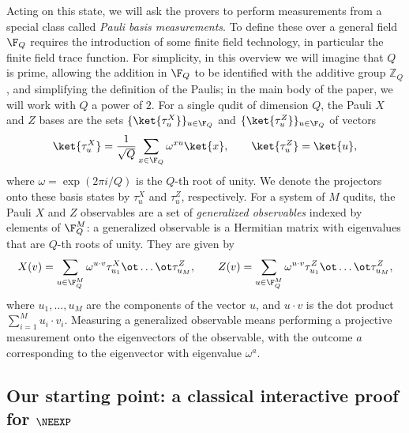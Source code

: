 Acting on this state, we will ask the provers to perform measurements
from a special class called \emph{Pauli basis measurements}. To define
these over a general field $\F_Q$ requires the introduction of some
finite field technology, in particular the finite field trace
function. For simplicity, in this overview we will imagine that $Q$ is
prime, allowing the addition in $\F_Q$ to be identified with the
additive group $\mathbb{Z}_Q$, and simplifying the definition of the
Paulis; in the main body of the paper, we will work with $Q$ a power
of $2$. For a single qudit of dimension $Q$, the Pauli $X$ and $Z$
bases are the sets $\{\ket{\tau^X_u}\}_{u \in \F_Q}$ and $\{\ket{\tau^Z_u}\}_{u
  \in \F_Q}$ of vectors
\[ \ket{\tau^X_u} = \frac{1}{\sqrt{Q}}\sum_{x \in \F_Q}  \omega^{x u} \ket{x}, \qquad
  \ket{\tau^Z_u} = \ket{u}, \]
where $\omega = \exp(2\pi i/Q)$ is the $Q$-th root of unity. We denote
the projectors onto these basis states by $\tau^X_u$ and $\tau^Z_u$,
respectively. For a system of $M$ qudits, the Pauli
$X$ and $Z$ observables are a set of \emph{generalized observables}
indexed by elements of $\F_Q^M$: a generalized observable is a
Hermitian matrix with eigenvalues that are $Q$-th roots of unity.
They are given by
\[ X(v) =\sum_{u \in \F_Q^M} \omega^{u \cdot v} \tau^X_{u_1} \ot \dots
  \ot \tau^Z_{u_M}, 
  \qquad Z(v) = \sum_{u \in \F_Q^M} \omega^{u \cdot v} \tau^Z_{u_1}
  \ot \dots \ot \tau^Z_{u_M},\]
where $u_1, \dots, u_M$ are the components of the vector $u$, and
$u\cdot v$ is the dot product $\sum_{i=1}^{M} u_i \cdot
v_i$. Measuring a generalized observable means performing a projective
measurement onto the eigenvectors of the observable, with the
outcome $a$ corresponding to the eigenvector with eigenvalue
$\omega^{a}$. 



\subsection{Our starting point: a classical interactive proof for
  $\NEEXP$}

